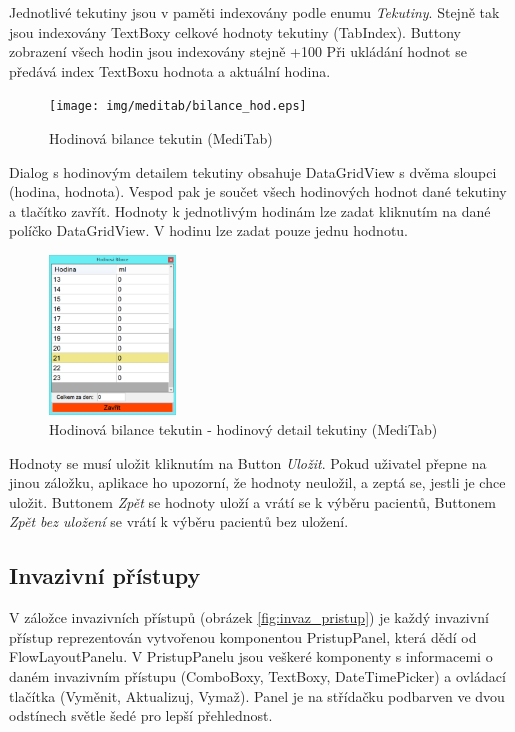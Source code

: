 Jednotlivé tekutiny jsou v paměti indexovány podle enumu \emph{Tekutiny}. Stejně tak jsou indexovány TextBoxy celkové hodnoty tekutiny (TabIndex). Buttony zobrazení všech hodin jsou indexovány stejně +100 Při ukládání hodnot se předává index TextBoxu hodnota a aktuální hodina.

\begin{figure}[H]
	\centering
	\texttt{[image: img/meditab/bilance\_hod.eps]}
	\caption{Hodinová bilance tekutin (MediTab)}
  \label{fig:bilance_hod}
\end{figure}

Dialog s hodinovým detailem tekutiny obsahuje DataGridView s dvěma sloupci (hodina, hodnota). Vespod pak je součet všech hodinových hodnot dané tekutiny a tlačítko zavřít. Hodnoty k jednotlivým hodinám lze zadat kliknutím na dané políčko DataGridView. V hodinu lze zadat pouze jednu hodnotu.

\begin{figure}[H]
	\centering
	\includegraphics[width=0.3\textwidth]{img/meditab/bilance_hod_detail.eps}
	\caption{Hodinová bilance tekutin - hodinový detail tekutiny (MediTab)}
  \label{fig:bilance_hod_detail}
\end{figure}

Hodnoty se musí uložit kliknutím na Button \emph{Uložit}. Pokud uživatel přepne na jinou záložku, aplikace ho upozorní, že hodnoty neuložil, a zeptá se, jestli je chce uložit. Buttonem \emph{Zpět} se hodnoty uloží a vrátí se k výběru pacientů, Buttonem \emph{Zpět bez uložení} se vrátí k výběru pacientů bez uložení.


\subsection{Invazivní přístupy}
\label{ch:pristup}

V záložce invazivních přístupů (obrázek \ref{fig:invaz_pristup}) je každý invazivní přístup reprezentován vytvořenou komponentou PristupPanel, která dědí od FlowLayoutPanelu. V PristupPanelu jsou veškeré komponenty s informacemi o daném invazivním přístupu (ComboBoxy, TextBoxy, DateTimePicker) a ovládací tlačítka (Vyměnit, Aktualizuj, Vymaž). Panel je na střídačku podbarven ve dvou odstínech světle šedé pro lepší přehlednost.

